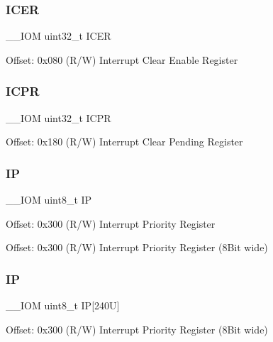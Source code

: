 \subsubsection{\texorpdfstring{I\+C\+ER}{ICER}}
{\footnotesize\ttfamily \+\_\+\+\_\+\+I\+OM uint32\+\_\+t I\+C\+ER}

Offset\+: 0x080 (R/W) Interrupt Clear Enable Register \mbox{\label{struct_n_v_i_c___type_a4d45961e44d2663447bbf0111755c0e7}} 
\subsubsection{\texorpdfstring{I\+C\+PR}{ICPR}}
{\footnotesize\ttfamily \+\_\+\+\_\+\+I\+OM uint32\+\_\+t I\+C\+PR}

Offset\+: 0x180 (R/W) Interrupt Clear Pending Register \mbox{\label{struct_n_v_i_c___type_a1787506107747d2dedae05295d3532da}} 
\subsubsection{\texorpdfstring{IP}{IP}\hspace{0.1cm}{\footnotesize\ttfamily [1/2]}}
{\footnotesize\ttfamily \+\_\+\+\_\+\+I\+OM uint8\+\_\+t IP}

Offset\+: 0x300 (R/W) Interrupt Priority Register

Offset\+: 0x300 (R/W) Interrupt Priority Register (8\+Bit wide) \mbox{\label{struct_n_v_i_c___type_a4fda947a8fd3237a89d43b7d5a1057cb}} 
\subsubsection{\texorpdfstring{IP}{IP}\hspace{0.1cm}{\footnotesize\ttfamily [2/2]}}
{\footnotesize\ttfamily \+\_\+\+\_\+\+I\+OM uint8\+\_\+t IP\mbox{[}240\+U\mbox{]}}

Offset\+: 0x300 (R/W) Interrupt Priority Register (8\+Bit wide) \mbox{\label{struct_n_v_i_c___type_a1f970af55366c7caaf51407309f304db}} 

